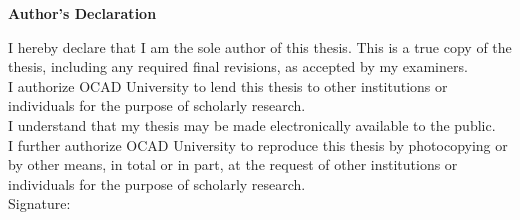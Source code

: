 \begin{center}
\large\textbf{Author's Declaration}
\end{center}

\normalsize
\noindent
I hereby declare that I am the sole author of this thesis. This is a true copy of the thesis, including any required final revisions, as accepted by my examiners.
\\[0.5cm]
I authorize OCAD University to lend this thesis to other institutions or individuals for the purpose of scholarly research.
\\[0.5cm]
I understand that my thesis may be made electronically available to the public.
\\[0.5cm]
I further authorize OCAD University to reproduce this thesis by photocopying or by other means, in total or in part, at the request of other institutions or individuals for the purpose of scholarly research.
\\[1cm]
Signature: \hspace{0.25cm} \makebox[7.5cm]{\hrulefill}		%